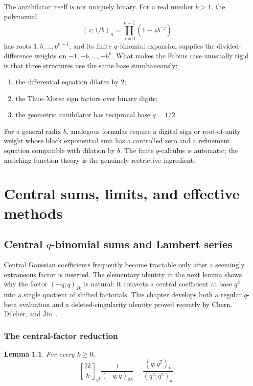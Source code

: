 \documentclass[11pt,oneside,openany]{book}
\newtheorem{lemma}[theorem]{Lemma}
\theoremstyle{definition}
\theoremstyle{remark}
\newcommand{\Qbinom}[3]{\genfrac{[}{]}{0pt}{}{#1}{#2}_{#3}}
\begin{document}
The annihilator itself is not uniquely binary.  For a real number $b>1$, the polynomial
\[
 (z;1/b)_n=\prod_{j=0}^{n-1}(1-zb^{-j})
\]
has roots $1,b,\ldots,b^{n-1}$, and its finite $q$-binomial expansion supplies the divided-difference weights on $-1,-b,\ldots,-b^n$.  What makes the Fabius case unusually rigid is that three structures use the same base simultaneously:
\begin{enumerate}
\item the differential equation dilates by $2$;
\item the Thue--Morse sign factors over binary digits;
\item the geometric annihilator has reciprocal base $q=1/2$.
\end{enumerate}
For a general radix $b$, analogous formulas require a digital sign or root-of-unity weight whose block exponential sum has a controlled zero and a refinement equation compatible with dilation by $b$.  The finite $q$-calculus is automatic; the matching function theory is the genuinely restrictive ingredient.


\part{Central sums, limits, and effective methods}

\chapter{Central \texorpdfstring{$q$}{q}-binomial sums and Lambert series}\label{chap:central}

Central Gaussian coefficients frequently become tractable only after a seemingly extraneous factor is inserted.  The elementary identity in the next lemma shows why the factor $(-q;q)_{2k}$ is natural: it converts a central coefficient at base $q^2$ into a single quotient of shifted factorials.  This chapter develops both a regular $q$-beta evaluation and a deleted-singularity identity proved recently by Chern, Dilcher, and Jiu~\cite{ChernDilcherJiu2026}.

\section{The central-factor reduction}

\begin{lemma}\label{lem:central-reduction}
For every $k\ge0$,
\[
 \Qbinom{2k}{k}{q^2}\frac1{(-q;q)_{2k}}
 =\frac{(q;q^2)_k}{(q^2;q^2)_k}.
 \tag{18.1}\label{eq:central-reduction}
\]
\end{lemma}
\end{document}
